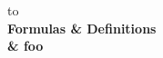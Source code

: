 \documentclass[10pt,a4paper]{article}
\begin{document}
\begin{tabu} to \textwidth{|X[c]|X[c]|} \hline
   \\ \hline
  \rowfont\bfseries Formulas & Definitions \\ \hline
   & foo \\ \hline
\end{tabu}
\end{document}
